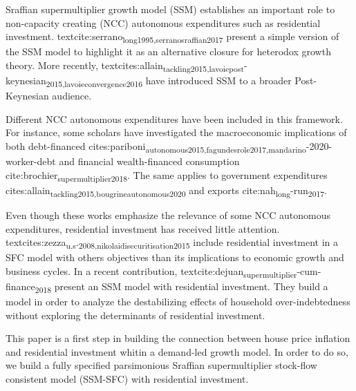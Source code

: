 \documentclass[12pt]{article}
\begin{document}
Sraffian supermultiplier growth model (SSM) establishes an important role to non-capacity creating (NCC) autonomous expenditures such
as residential investment.
textcite:serrano\textsubscript{long}\textsubscript{1995,serrano}\textsubscript{sraffian}\textsubscript{2017} present a simple version of the SSM model to highlight it as an alternative closure for heterodox growth theory.
More recently, textcites:allain\textsubscript{tackling}\textsubscript{2015,lavoie}\textsubscript{post}-keynesian\textsubscript{2015,lavoie}\textsubscript{convergence}\textsubscript{2016} have introduced SSM to a broader Post-Keynesian audience.

Different NCC autonomous expenditures have been included in this framework. 
For instance, some scholars have investigated the macroeconomic implications of both debt-financed cites:pariboni\textsubscript{autonomous}\textsubscript{2015,fagundes}\textsubscript{role}\textsubscript{2017,mandarino}-2020-worker-debt and financial wealth-financed consumption cite:brochier\textsubscript{supermultiplier}\textsubscript{2018}.
The same applies to government expenditures cites:allain\textsubscript{tackling}\textsubscript{2015,bougrine}\textsubscript{autonomous}\textsubscript{2020} and exports cite:nah\textsubscript{long}-run\textsubscript{2017}.

Even though these works emphasize the relevance of some NCC autonomous expenditures, residential investment has received little attention.
textcites:zezza\textsubscript{u.s}.\textsubscript{2008,nikolaidi}\textsubscript{securitisation}\textsubscript{2015} include residential investment in a SFC model with others objectives than its implications to economic growth and business cycles.
In a recent contribution, textcite:dejuan\textsubscript{supermultiplier}-cum-finance\textsubscript{2018} present an SSM model with residential investment.
They build a model in order to analyze the destabilizing effects of household over-indebtedness without exploring the determinants of residential investment.

This paper is a first step in building the connection between house price inflation and residential investment whitin a demand-led growth model.
In order to do so, we build a fully specified parsimonious Sraffian supermultiplier stock-flow consistent model (SSM-SFC) with residential investment.
\end{document}
